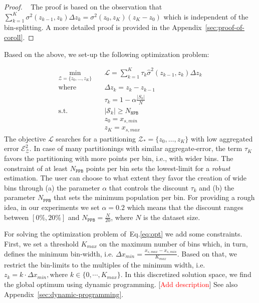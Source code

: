 \documentclass[twoside]{article}
\newcommand{\todo}[1]{[\textcolor{red}{#1}]}
\begin{document}
\begin{proof}
  ~\label{sec:coroll-1} The proof is based on the observation that
  \(\sum_{k=1}^K \sigma^2(z_{k-1}, z_k) \Delta z_k = \sigma^2(z_0,
  z_K) (z_K - z_0)\) which is independent of the bin-splitting. A more
  detailed proof is provided in the Appendix~\ref{sec:proof-of-coroll}.
 \end{proof}

Based on the above, we set-up the following optimization problem:

\begin{equation}
  \label{eq:opt}
\begin{aligned}
  \min_{ \mathcal{Z} = \{z_0, \ldots, z_K\}} \quad & \mathcal{L} = \sum_{k=1}^K \tau_k \hat{\sigma}^2(z_{k-1}, z_k) \Delta z_k \\
  \textrm{where} \quad & \Delta z_k = z_k - z_{k-1} \\
  & \tau_k = 1 - \alpha \frac{|S_k|}{N} \\
  \textrm{s.t.} \quad & |\mathcal{S}_k| \geq N_{\mathtt{NPB}}\\
                                     & z_0 = x_{s,min}\\
                                     & z_K = x_{s, max}
\end{aligned}
\end{equation}
%
The objective \(\mathcal{L}\) searches for a partitioning
\(\mathcal{Z}_* = \{ z_0, \ldots, z_K \} \) with low aggregated error
\(\mathcal{E}_{\mathcal{Z}}^2\). In case of many partitionings with
similar aggregate-error, the term \(\tau_K\) favors the partitioning
with more points per bin, i.e., with wider bins. The constraint of at
least \(N_{\mathtt{PPB}}\) points per bin sets the lowest-limit for a
\textit{robust} estimation. The user can choose to what extent they
favor the creation of wide bins through (a) the parameter \(\alpha\)
that controls the discount \(\tau_k\) and (b) the parameter
\(N_{\mathtt{PPB}}\) that sets the minimum population per bin. For
providing a rough idea, in our experiments we set \(\alpha = 0.2\)
which means that the discount ranges between \([0\%, 20\%]\) and
\(N_{\mathtt{PPB}} = \frac{N}{20}\), where \(N\) is the dataset size.

For solving the optimization problem of~Eq.\ref{eq:opt} we add some
constraints. First, we set a threshold \(K_{max}\) on the maximum
number of bins which, in turn, defines the minimum bin-width,
i.e. \(\Delta x_{min} = \frac{x_{s, max} - x_{s,min}}{K_{max}}\).
Based on that, we restrict the bin-limits to the multiples of the
minimum width, i.e.
\(z_k = k\cdot \Delta x_{min}, \text{where } k \in \{0 , \cdots,
K_{max}\} \). In this discretized solution space, we find the global
optimum using dynamic programming. \todo{Add description} See also
Appendix~\ref{sec:dynamic-programming}.
\end{document}
